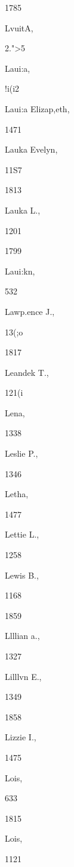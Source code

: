 \documentclass{book}
\begin{document}
{{1785 


LvuitA, 


2.">5 




Laui:a, 


!i(i2 




Laui:a Elizap,eth, 


1471 




Lauka Evelyn, 


11S7 


1813 


Lauka L., 


1201 


1799 


Laui:kn, 


532 




Lawp.ence J., 


13(;o 


1817 


Leandek T., 


121(i 




Lena, 


1338 




Leslie P., 


1346 




Letha, 


1477 




Lettie L., 


1258 




Lewis B., 


1168 


1859 


Llllian a., 


1327 




Lilllvn E., 


1349 


1858 


Lizzie I., 


1475 




Lois, 


633 


1815 


Lois, 


1121 


}}
\end{document}
